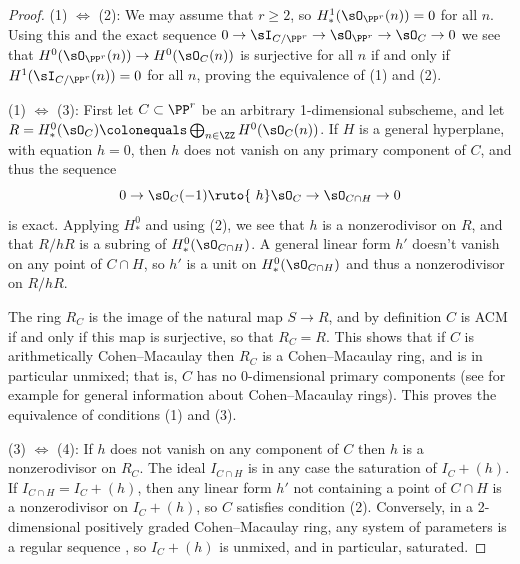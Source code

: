 \begin{proof}
\def\sl#1{(#1)}
\let\rTo\to
\let\Leftrightarrow\iff
{\sl 1} $\Leftrightarrow$ {\sl 2}: We may assume that $r\geq 2$, so $H^1_*(\sO_{\PP^r}(n)) = 0$ for all $n$. Using this and the exact sequence 
$
0\rTo \sI_{C/\PP^r}  \rTo  \sO_{\PP^r}  \rTo  \sO_C  \rTo  0
$
we see that $H^0(\sO_{\PP^r}(n)) \to H^0(\sO_C(n))$ is surjective for all $n$ if and only if $H^1(\sI_{C/\PP^r}(n)) = 0$ for all $n$,
proving the equivalence of {\sl 1} and {\sl 2.}

{\sl 1} $\Leftrightarrow$ {\sl 3}: First let $C\subset \PP^r$ be an arbitrary 1-dimensional subscheme,
and let $R =H^0_*(\sO_{C}) \colonequals \bigoplus_{n\in \ZZ} H^0(\sO_{C}(n))$.
If $H$ is a 
general hyperplane, with equation $h=0$, then $h$ does not vanish on any primary component of $C$, and thus the sequence
$$
0\rTo \sO_C(-1) \ruto{\ h}\sO_C\rTo \sO_{C\cap H}\rTo 0
$$
is exact. Applying $H^0_*$ and using 
(2),
we see that $h$ is a nonzerodivisor on $R$, and that $R/hR$ is
a subring of $H^0_*(\sO_{C\cap H})$.  A general linear form $h'$ doesn't vanish on
any point of $C\cap H$, so $h'$ is a unit on $H^0_*(\sO_{C\cap H})$
and thus a nonzerodivisor on $R/hR$. 

The ring $R_C$ is the image of the natural map $S\to R$, and by definition $C$ is ACM if and only if this map is surjective,
so that $R_C = R.$ This shows that if $C$ is arithmetically Cohen--Macaulay then $R_C$ is a Cohen--Macaulay ring,
and is in particular unmixed; that is, $C$ has no 0-dimensional primary components (see for example \cite[Chapter 18]{Eisenbud1995} for general
information about Cohen--Macaulay rings). This proves the equivalence of conditions {\sl 1} and {\sl 3.}


{\sl 3} $\Leftrightarrow$ {\sl 4}: If  $h$ does not vanish on any component of $C$ then $h$ is a nonzerodivisor on $R_C$. The ideal $I_{C\cap H}$ is in any case the saturation of $I_C+(h)$. 
If $I_{C\cap H}=I_C+(h)$, then any linear form $h'$ not containing a point of $C\cap H$ is a nonzerodivisor
on $I_C+(h)$, so $C$ satisfies condition {\sl 2}. Conversely, in a 2-dimensional positively graded Cohen--Macaulay ring, any 
system of parameters is a regular sequence \cite[Section 18.2]{Eisenbud1995}, so $I_C+(h)$ is unmixed, and in particular, saturated.
\end{proof}

